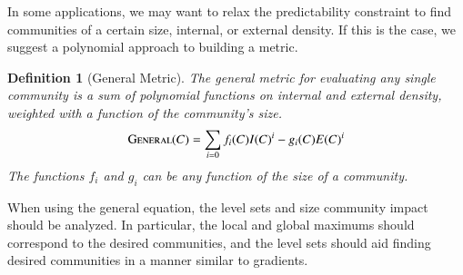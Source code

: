 \documentclass[phd,tocprelim]{cornell}
\newtheorem{definition}{Definition}
\begin{document}
In some applications, we may want to relax the predictability constraint to find communities of a certain size, internal, or external density.  If this is the case, we suggest a polynomial approach to building a metric.
\begin{definition}[General Metric] The general metric for evaluating any single community is a sum of polynomial functions on internal and external density, weighted with a function of the community's size.
  \begin{equation}
   \mbox{\sc General}(C) = \sum\limits_{i = 0} f_i(C) I(C)^i - g_i(C) E(C)^i
  \end{equation}
The functions $f_i$ and $g_i$ can be any function of the size of a community.
\end{definition}
When using the general equation, the level sets and size community impact should be analyzed.  In particular, the local and global maximums should correspond to the desired communities, and the level sets should aid finding desired communities in a manner similar to gradients.
\end{document}

